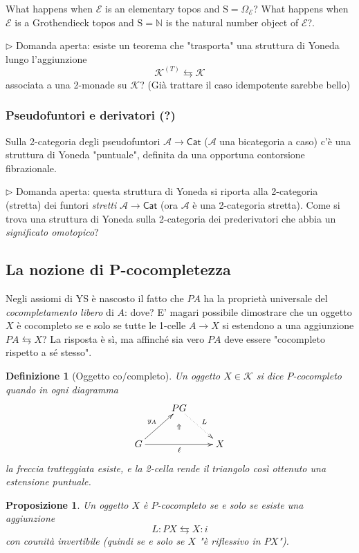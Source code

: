 \documentclass[11pt]{article}
\def\Cat{\mathsf{Cat}}
\theoremstyle{reference}
\newtheorem{definition}[theorem]{Definizione}
\newtheorem{proposition}[theorem]{Proposizione}
\begin{document}
What happens when \(\mathcal E\) is an elementary topos and
\(\mathrm{S}=\Omega_{\mathcal E}\)? What happens when
\(\mathcal E\) is a Grothendieck topos and \(\mathrm S =
\mathbb{N}\) is the natural number object of \(\mathcal E\)?.

\(\rhd\) Domanda aperta: esiste un teorema che "trasporta" una
struttura di Yoneda lungo l'aggiunzione $$ \mathcal K^{(T)}
\leftrightarrows \mathcal K $$ associata a una 2-monade su
\(\mathcal K\)? (Già trattare il caso idempotente sarebbe
bello)

\subsubsection{Pseudofuntori e derivatori (?)}
\label{sec:org56b2f4c}

Sulla 2-categoria degli pseudofuntori \(\mathcal A \to \Cat\)
(\(\mathcal A\) una bicategoria a caso) c'è una struttura di
Yoneda "puntuale", definita da una opportuna contorsione
fibrazionale.

\(\rhd\) Domanda aperta: questa struttura di Yoneda si riporta
alla 2-categoria (stretta) dei funtori \emph{stretti} \(\mathcal A
\to \Cat\) (ora \(\mathcal A\) è una 2-categoria stretta). Come
si trova una struttura di Yoneda sulla 2-categoria dei
prederivatori che abbia un \emph{significato omotopico}?

\subsection{La nozione di P-cocompletezza}
\label{sec:org70d3bdf}

Negli assiomi di YS è nascosto il fatto che \(PA\) ha la
proprietà universale del \emph{cocompletamento libero} di \(A\):
dove? E' magari possibile dimostrare che un oggetto \(X\) è
cocompleto se e solo se tutte le 1-celle \(A\to X\) si
estendono a una aggiunzione \(PA \leftrightarrows X\)? La
risposta è sì, ma affinché sia vero \(PA\) deve essere
"cocompleto rispetto a sé stesso".

\begin{definition}[Oggetto co/completo]
Un oggetto $X\in \mathcal K$ si dice $P$\hyp{}\emph{cocompleto} quando in ogni diagramma
$$
\xymatrix{
& PG\ar@{.>}[dr]^L & \\
G\ar[rr]_\ell\ar[ur]^{y_A} &\ar@{}[u]|\Uparrow & X
}
$$
la freccia tratteggiata esiste, e la 2-cella rende il triangolo così ottenuto una estensione puntuale.
\end{definition}
\begin{proposition}
Un oggetto $X$ è $P$\hyp{}cocompleto se e solo se esiste una aggiunzione
$$
L : PX \leftrightarrows X : i 
$$
con counità invertibile (quindi se e solo se $X$ "è riflessivo in $PX$").
\end{proposition}
\end{document}
